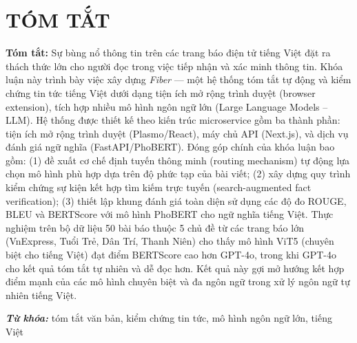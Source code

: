 \chapter*{TÓM TẮT}

\textbf{Tóm tắt:} Sự bùng nổ thông tin trên các trang báo điện tử tiếng Việt đặt ra thách thức lớn cho người đọc trong việc tiếp nhận và xác minh thông tin. Khóa luận này trình bày việc xây dựng \textit{Fiber} --- một hệ thống tóm tắt tự động và kiểm chứng tin tức tiếng Việt dưới dạng tiện ích mở rộng trình duyệt (browser extension), tích hợp nhiều mô hình ngôn ngữ lớn (Large Language Models -- LLM). Hệ thống được thiết kế theo kiến trúc microservice gồm ba thành phần: tiện ích mở rộng trình duyệt (Plasmo/React), máy chủ API (Next.js), và dịch vụ đánh giá ngữ nghĩa (FastAPI/PhoBERT). Đóng góp chính của khóa luận bao gồm: (1) đề xuất cơ chế định tuyến thông minh (routing mechanism) tự động lựa chọn mô hình phù hợp dựa trên độ phức tạp của bài viết; (2) xây dựng quy trình kiểm chứng sự kiện kết hợp tìm kiếm trực tuyến (search-augmented fact verification); (3) thiết lập khung đánh giá toàn diện sử dụng các độ đo ROUGE, BLEU và BERTScore với mô hình PhoBERT cho ngữ nghĩa tiếng Việt. Thực nghiệm trên bộ dữ liệu 50 bài báo thuộc 5 chủ đề từ các trang báo lớn (VnExpress, Tuổi Trẻ, Dân Trí, Thanh Niên) cho thấy mô hình ViT5 (chuyên biệt cho tiếng Việt) đạt điểm BERTScore cao hơn GPT-4o, trong khi GPT-4o cho kết quả tóm tắt tự nhiên và dễ đọc hơn. Kết quả này gợi mở hướng kết hợp điểm mạnh của các mô hình chuyên biệt và đa ngôn ngữ trong xử lý ngôn ngữ tự nhiên tiếng Việt.

\textit{\textbf{Từ khóa:}} tóm tắt văn bản, kiểm chứng tin tức, mô hình ngôn ngữ lớn, tiếng Việt
